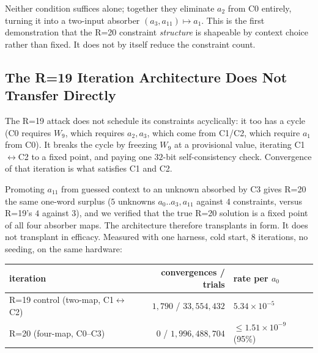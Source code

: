 \documentclass[11pt,a4paper]{article}
\begin{document}
Neither condition suffices alone; together they eliminate $a_2$ from C0 entirely,
turning it into a two-input absorber $(a_3,a_{11})\mapsto a_1$.  This is the first
demonstration that the R=20 constraint \emph{structure} is shapeable by context
choice rather than fixed.  It does not by itself reduce the constraint count.

\subsection{The R=19 Iteration Architecture Does Not Transfer Directly}
\label{sec:noniter}

The R=19 attack does not schedule its constraints acyclically: it too has a cycle
(C0 requires $W_9$, which requires $a_2,a_3$, which come from C1/C2, which require
$a_1$ from C0).  It breaks the cycle by freezing $W_9$ at a provisional value,
iterating C1$\leftrightarrow$C2 to a fixed point, and paying one $32$-bit
self-consistency check.  Convergence of that iteration is what satisfies C1 and C2.

Promoting $a_{11}$ from guessed context to an unknown absorbed by C3 gives R=20 the
same one-word surplus ($5$ unknowns $a_0..a_3,a_{11}$ against $4$ constraints,
versus R=19's $4$ against $3$), and we verified that the true R=20 solution is a
fixed point of all four absorber maps.  The architecture therefore transplants in
form.  It does not transplant in efficacy.  Measured with one harness, cold start,
$8$ iterations, no seeding, on the same hardware:

\begin{center}
\begin{tabular}{lrl}
\hline
iteration & convergences / trials & rate per $a_0$ \\
\hline
R=19 control (two-map, C1$\leftrightarrow$C2) & $1{,}790$ / $33{,}554{,}432$ & $5.34\times10^{-5}$ \\
R=20 (four-map, C0--C3) & $0$ / $1{,}996{,}488{,}704$ & $\le1.51\times10^{-9}$ (95\%) \\
\hline
\end{tabular}
\end{center}
\end{document}
